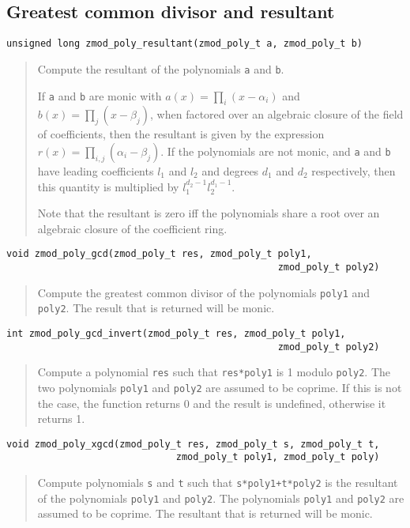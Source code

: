 \documentclass[a4paper,10pt]{article}
\newcommand{\code}{\lstinline}
\begin{document}
\subsection{Greatest common divisor and resultant}
\begin{lstlisting}
unsigned long zmod_poly_resultant(zmod_poly_t a, zmod_poly_t b)
\end{lstlisting}
\begin{quote}
Compute the resultant of the polynomials \code{a} and \code{b}. 

If \code{a} and \code{b} are monic with $a(x) = \prod_i (x - \alpha_i)$ and $b(x) = \prod_j (x - \beta_j)$, when factored over an algebraic closure of the field of coefficients, then the resultant is given by the expression $r(x) = \prod_{i,j} (\alpha_i - \beta_j)$. If the polynomials are not monic, and \code{a} and \code{b} have leading coefficients $l_1$ and $l_2$ and degrees $d_1$ and $d_2$ respectively, then this quantity is multiplied by $l_1^{d_2-1}l_2^{d_1-1}$.

Note that the resultant is zero iff the polynomials share a root over an algebraic closure of the coefficient ring.

\end{quote}

\begin{lstlisting}
void zmod_poly_gcd(zmod_poly_t res, zmod_poly_t poly1, 
                                                zmod_poly_t poly2)
\end{lstlisting}
\begin{quote}
Compute the greatest common divisor of the polynomials \code{poly1} and \code{poly2}. The result that is returned will be monic.
\end{quote}

\begin{lstlisting}
int zmod_poly_gcd_invert(zmod_poly_t res, zmod_poly_t poly1, 
                                                zmod_poly_t poly2)
\end{lstlisting}
\begin{quote}
Compute a polynomial \code{res} such that \code{res*poly1} is 1 modulo \code{poly2}. The two polynomials \code{poly1} and \code{poly2} are assumed to be coprime. If this is not the case, the function returns 0 and the result is undefined, otherwise it returns 1.
\end{quote}

\begin{lstlisting}
void zmod_poly_xgcd(zmod_poly_t res, zmod_poly_t s, zmod_poly_t t,  
                              zmod_poly_t poly1, zmod_poly_t poly)
\end{lstlisting}
\begin{quote}
Compute polynomials \code{s} and \code{t} such that \code{s*poly1+t*poly2} is the resultant of the polynomials \code{poly1} and \code{poly2}. The polynomials \code{poly1} and \code{poly2} are assumed to be coprime. The resultant that is returned will be monic.
\end{quote}
\end{document}
